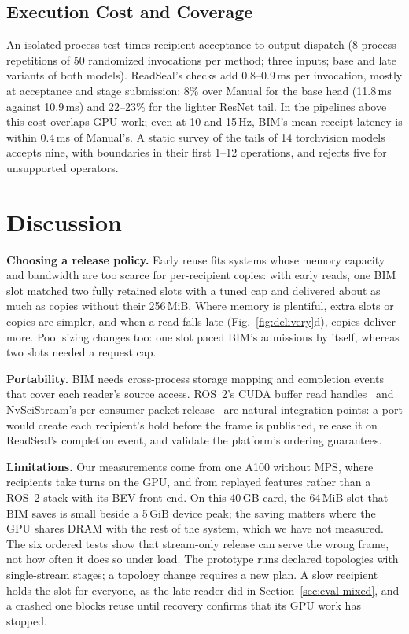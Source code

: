 \documentclass[conference]{IEEEtran}
\newcommand{\MiB}{\,MiB}
\newcommand{\ms}{\,ms}
\newcommand{\Hz}{\,Hz}
\begin{document}
\subsection{Execution Cost and Coverage}
\label{sec:eval-cost}

An isolated-process test times recipient acceptance to output dispatch (8 process repetitions of 50 randomized invocations per method; three inputs; base and late variants of both models). ReadSeal's checks add 0.8--0.9\ms{} per invocation, mostly at acceptance and stage submission: 8\% over Manual for the base head (11.8\ms{} against 10.9\ms) and 22--23\% for the lighter ResNet tail. In the pipelines above this cost overlaps GPU work; even at 10 and 15\Hz, BIM's mean receipt latency is within 0.4\ms{} of Manual's. A static survey of the tails of 14 torchvision models accepts nine, with boundaries in their first 1--12 operations, and rejects five for unsupported operators.

\section{Discussion}
\label{sec:discussion}

\textbf{Choosing a release policy.} Early reuse fits systems whose memory capacity and bandwidth are too scarce for per-recipient copies: with early reads, one BIM slot matched two fully retained slots with a tuned cap and delivered about as much as copies without their 256\MiB. Where memory is plentiful, extra slots or copies are simpler, and when a read falls late (Fig.~\ref{fig:delivery}d), copies deliver more. Pool sizing changes too: one slot paced BIM's admissions by itself, whereas two slots needed a request cap.

\textbf{Portability.} BIM needs cross-process storage mapping and completion events that cover each reader's source access. ROS~2's CUDA buffer read handles~\cite{cudabackend} and NvSciStream's per-consumer packet release~\cite{nvscistream} are natural integration points: a port would create each recipient's hold before the frame is published, release it on ReadSeal's completion event, and validate the platform's ordering guarantees.

\textbf{Limitations.} Our measurements come from one A100 without MPS, where recipients take turns on the GPU, and from replayed features rather than a ROS~2 stack with its BEV front end. On this 40\,GB card, the 64\MiB{} slot that BIM saves is small beside a 5\,GiB device peak; the saving matters where the GPU shares DRAM with the rest of the system, which we have not measured. The six ordered tests show that stream-only release can serve the wrong frame, not how often it does so under load. The prototype runs declared topologies with single-stream stages; a topology change requires a new plan. A slow recipient holds the slot for everyone, as the late reader did in Section~\ref{sec:eval-mixed}, and a crashed one blocks reuse until recovery confirms that its GPU work has stopped.
\end{document}
